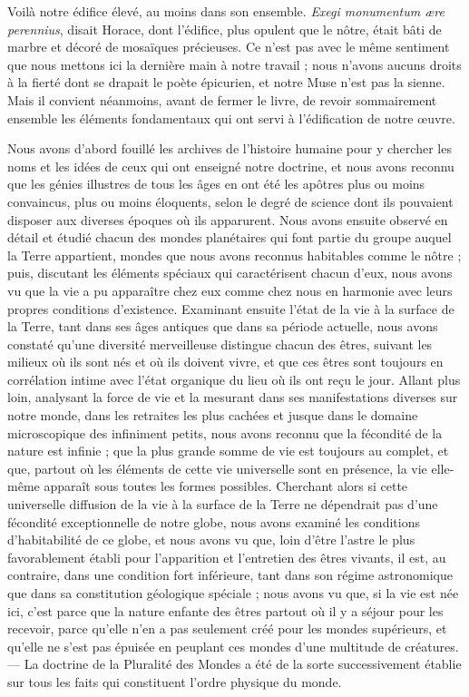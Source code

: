 \documentclass[a4paper, 11pt, oneside, landscape]{article}
\begin{document}
Voilà notre édifice élevé, au moins dans son ensemble. \emph{Exegi monumentum ære perennius}, disait Horace, dont l'édifice, plus opulent que le nôtre, était bâti de marbre et décoré de mosaïques précieuses. Ce n'est pas avec le même sentiment que nous mettons ici la dernière main à notre travail ; nous n'avons aucuns droits à la fierté dont se drapait le poète épicurien, et notre Muse n'est pas la sienne. Mais il convient néanmoins, avant de fermer le livre, de revoir sommairement ensemble les éléments fondamentaux qui ont servi à l'édification de notre œuvre.

Nous avons d'abord fouillé les archives de l'histoire humaine pour y chercher les noms et les idées de ceux qui ont enseigné notre doctrine, et nous avons reconnu que les génies illustres de tous les âges en ont été les apôtres plus ou moins convaincus, plus ou moins éloquents, selon le degré de science dont ils pouvaient disposer aux diverses époques où ils apparurent. Nous avons ensuite observé en détail et étudié chacun des mondes planétaires qui font partie du groupe auquel la Terre appartient, mondes que nous avons reconnus habitables comme le nôtre ; puis, discutant les éléments spéciaux qui caractérisent chacun d'eux, nous avons vu que la vie a pu apparaître chez eux comme chez nous en harmonie avec leurs propres conditions d'existence. Examinant ensuite l'état de la vie à la surface de la Terre, tant dans ses âges antiques que dans sa période actuelle, nous avons constaté qu'une diversité merveilleuse distingue chacun des êtres, suivant les milieux où ils sont nés et où ils doivent vivre, et que ces êtres sont toujours en corrélation intime avec l'état organique du lieu où ils ont reçu le jour. Allant plus loin, analysant la force de vie et la mesurant dans ses manifestations diverses sur notre monde, dans les retraites les plus cachées et jusque dans le domaine microscopique des infiniment petits, nous avons reconnu que la fécondité de la nature est infinie ; que la plus grande somme de vie est toujours au complet, et que, partout où les éléments de cette vie universelle sont en présence, la vie elle-même apparaît sous toutes les formes possibles. Cherchant alors si cette universelle diffusion de la vie à la surface de la Terre ne dépendrait pas d'une fécondité exceptionnelle de notre globe, nous avons examiné les conditions d'habitabilité de ce globe, et nous avons vu que, loin d'être l'astre le plus favorablement établi pour l'apparition et l'entretien des êtres vivants, il est, au contraire, dans une condition fort inférieure, tant dans son régime astronomique que dans sa constitution géologique spéciale ; nous avons vu que, si la vie est née ici, c'est parce que la nature enfante des êtres partout où il y a séjour pour les recevoir, parce qu'elle n'en a pas seulement créé pour les mondes supérieurs, et qu'elle ne s'est pas épuisée en peuplant ces mondes d'une multitude de créatures. --- La doctrine de la Pluralité des Mondes a été de la sorte successivement établie sur tous les faits qui constituent l'ordre physique du monde.
\end{document}
